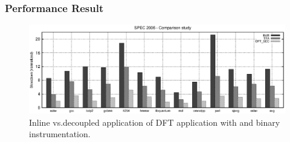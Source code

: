\subsubsection{Performance Result}

\begin{figure}[tb]
    \centering
    \includegraphics[width=\linewidth]{figs/s2k6.eps}
    \caption{Inline vs.decoupled application of DFT application with \sreplica
    and binary instrumentation.\label{fig:decoupling}}
\end{figure}
